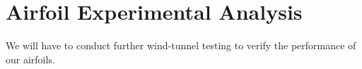 \section{Airfoil Experimental Analysis}
\begin{comment}
\end{comment}
We will have to conduct further wind-tunnel testing to verify the performance of our airfoils.

